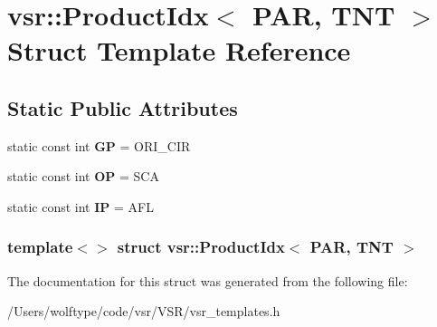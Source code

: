 \hypertarget{structvsr_1_1_product_idx_3_01_p_a_r_00_01_t_n_t_01_4}{\section{vsr\-:\-:Product\-Idx$<$ P\-A\-R, T\-N\-T $>$ Struct Template Reference}
\label{structvsr_1_1_product_idx_3_01_p_a_r_00_01_t_n_t_01_4}
}
\subsection*{Static Public Attributes}
\begin{DoxyCompactItemize}
\item 
\hypertarget{structvsr_1_1_product_idx_3_01_p_a_r_00_01_t_n_t_01_4_a60b015116961661e0c163ebacef4a3c6}{static const int {\bfseries G\-P} = O\-R\-I\-\_\-\-C\-I\-R}\label{structvsr_1_1_product_idx_3_01_p_a_r_00_01_t_n_t_01_4_a60b015116961661e0c163ebacef4a3c6}

\item 
\hypertarget{structvsr_1_1_product_idx_3_01_p_a_r_00_01_t_n_t_01_4_a84414d06d3ca1892a30f1ed5efe974f5}{static const int {\bfseries O\-P} = S\-C\-A}\label{structvsr_1_1_product_idx_3_01_p_a_r_00_01_t_n_t_01_4_a84414d06d3ca1892a30f1ed5efe974f5}

\item 
\hypertarget{structvsr_1_1_product_idx_3_01_p_a_r_00_01_t_n_t_01_4_a2d78868eec36b1969893df812e0a4104}{static const int {\bfseries I\-P} = A\-F\-L}\label{structvsr_1_1_product_idx_3_01_p_a_r_00_01_t_n_t_01_4_a2d78868eec36b1969893df812e0a4104}

\end{DoxyCompactItemize}
\subsubsection*{template$<$$>$ struct vsr\-::\-Product\-Idx$<$ P\-A\-R, T\-N\-T $>$}



The documentation for this struct was generated from the following file\-:\begin{DoxyCompactItemize}
\item 
/\-Users/wolftype/code/vsr/\-V\-S\-R/vsr\-\_\-templates.\-h\end{DoxyCompactItemize}
